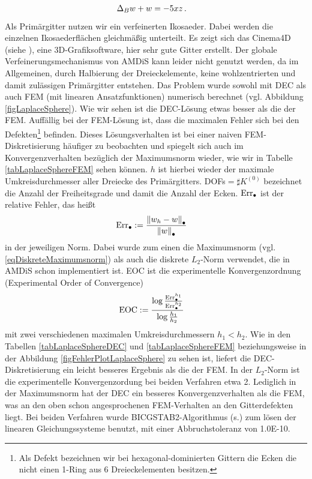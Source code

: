 \begin{beispiel}[Einheitssphäre]
\begin{align}
          \label{eqLaplaceSphereProblemUmform}
         \Delta_{B} w + w &= -5 x z \,\text{.}
       \end{align}
       Als Primärgitter nutzen wir ein verfeinerten Ikosaeder.
       Dabei werden die einzelnen Ikosaederflächen gleichmäßig unterteilt.
       Es zeigt sich das Cinema4D (siehe \cite{cinema4d}), eine 3D-Grafiksoftware, hier sehr gute Gitter erstellt.
       Der globale Verfeinerungsmechanismus von AMDiS kann leider nicht genutzt werden, da im Allgemeinen,
       durch Halbierung der Dreieckelemente, keine wohlzentrierten und damit zulässigen Primärgitter entstehen.
       Das Problem wurde sowohl mit DEC als auch FEM (mit linearen Ansatzfunktionen) 
       numerisch berechnet (vgl. Abbildung \ref{figLaplaceSphere}).
       Wie wir sehen ist die DEC-Lösung etwas besser als die der FEM.
       Auffällig bei der FEM-Lösung ist, dass die maximalen Fehler sich bei den Defekten\footnote{Als Defekt bezeichnen wir bei
       hexagonal-dominierten Gittern die Ecken die nicht einen 1-Ring aus 6 Dreieckelementen besitzen.} 
       befinden.
       Dieses Lösungsverhalten ist bei einer naiven FEM-Diskretisierung häufiger zu beobachten und spiegelt sich auch im
       Konvergenzverhalten bezüglich der Maximumsnorm wieder, wie wir in Tabelle \ref{tabLaplaceSphereFEM} sehen können.
       \( h \) ist hierbei wieder der maximale Umkreisdurchmesser aller Dreiecke des Primärgitters.
       DOFs\( = \sharp K^{(0)} \) bezeichnet die Anzahl der Freiheitsgrade und damit die Anzahl der Ecken.
       \( \text{Err}_{\bullet} \) ist der relative Fehler, das heißt
       \begin{align}
         \text{Err}_{\bullet} &:= \frac{\left\| w_{h} - w \right\|_{\bullet}}{\left\| w \right\|_{\bullet}}
       \end{align}
       in der jeweiligen Norm.
       Dabei wurde zum einen die Maximumsnorm (vgl. \ref{eqDiskreteMaximumsnorm}) als auch die diskrete \(
       L_{2} \)-Norm verwendet,
       die in AMDiS schon implementiert ist.
       EOC ist die experimentelle Konvergenzordnung (Experimental Order of Convergence)
       \begin{align}
         \text{EOC} &:= \frac{\log\frac{\text{Err}_{\bullet}^{h_{1}}}{\text{Err}_{\bullet}^{h_{2}}}}
                             {\log\frac{h_{1}}{h_{2}}}
       \end{align}
       mit zwei verschiedenen maximalen Umkreisdurchmessern \( h_{1} < h_{2} \).
       Wie in den Tabellen \ref{tabLaplaceSphereDEC} und \ref{tabLaplaceSphereFEM} beziehungsweise in der
       Abbildung \ref{figFehlerPlotLaplaceSphere} zu sehen ist, liefert die DEC-Diskretisierung ein leicht
       besseres Ergebnis als die der FEM.
       In der \( L_{2} \)-Norm ist die experimentelle Konvergenzordung bei beiden Verfahren etwa 2.
       Lediglich in der Maximumsnorm hat der DEC ein besseres Konvergenzverhalten als die FEM, 
       was an den oben schon
       angesprochenen FEM-Verhalten an den Gitterdefekten liegt.
       Bei beiden Verfahren wurde BICGSTAB2-Algorithmus (s.\cite{bicgstab2}) zum lösen der linearen
       Gleichungssysteme benutzt, mit einer Abbruchstoleranz von 1.0E-10.


\end{beispiel}
